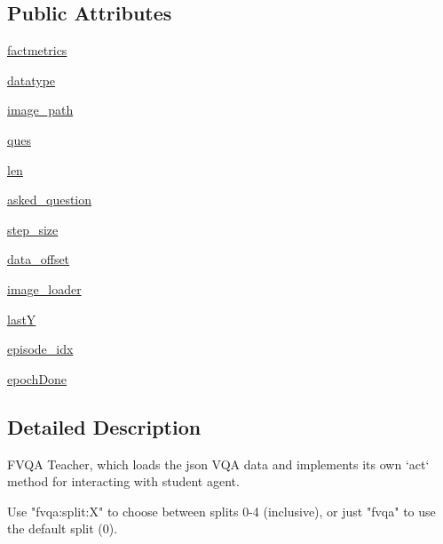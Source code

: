 \subsection*{Public Attributes}
\begin{DoxyCompactItemize}
\item 
\hyperlink{classparlai_1_1tasks_1_1fvqa_1_1agents_1_1SplitTeacher_af9e37d68ef2933f54b5d7f0256ac868d}{factmetrics}
\item 
\hyperlink{classparlai_1_1tasks_1_1fvqa_1_1agents_1_1SplitTeacher_aef55c744ce7578bbe76da7523d38e9ab}{datatype}
\item 
\hyperlink{classparlai_1_1tasks_1_1fvqa_1_1agents_1_1SplitTeacher_a340656d30ffce73b20e4e4eaff111570}{image\+\_\+path}
\item 
\hyperlink{classparlai_1_1tasks_1_1fvqa_1_1agents_1_1SplitTeacher_a0b5fea9e97b0a1d4cf63097f2efcf8da}{ques}
\item 
\hyperlink{classparlai_1_1tasks_1_1fvqa_1_1agents_1_1SplitTeacher_a6543ea6773174b7e252eae4bd4bf7568}{len}
\item 
\hyperlink{classparlai_1_1tasks_1_1fvqa_1_1agents_1_1SplitTeacher_ad621ef602ff9dcaedb554651d524e429}{asked\+\_\+question}
\item 
\hyperlink{classparlai_1_1tasks_1_1fvqa_1_1agents_1_1SplitTeacher_a6d0dd7e2e4ba732905587ef8be1b3613}{step\+\_\+size}
\item 
\hyperlink{classparlai_1_1tasks_1_1fvqa_1_1agents_1_1SplitTeacher_a8f11dc84128c107aff1fc31c8ec91d7c}{data\+\_\+offset}
\item 
\hyperlink{classparlai_1_1tasks_1_1fvqa_1_1agents_1_1SplitTeacher_a838023ecd27c658a6d65bfb741c45213}{image\+\_\+loader}
\item 
\hyperlink{classparlai_1_1tasks_1_1fvqa_1_1agents_1_1SplitTeacher_a1579ae960bedae2a943961e9bdb2edb6}{lastY}
\item 
\hyperlink{classparlai_1_1tasks_1_1fvqa_1_1agents_1_1SplitTeacher_a7aa1bdb6afaaca6321a86b1c80f64b5d}{episode\+\_\+idx}
\item 
\hyperlink{classparlai_1_1tasks_1_1fvqa_1_1agents_1_1SplitTeacher_a3b16ec1a609706b9c8f9bd00ccf7673d}{epoch\+Done}
\end{DoxyCompactItemize}


\subsection{Detailed Description}
\begin{DoxyVerb}FVQA Teacher, which loads the json VQA data and implements its own `act` method for
interacting with student agent.

Use "fvqa:split:X" to choose between splits 0-4 (inclusive), or just "fvqa" to use
the default split (0).
\end{DoxyVerb}
 

